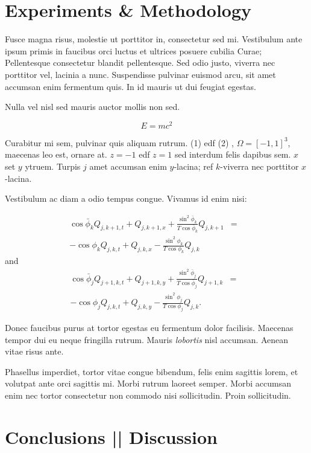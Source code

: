 \documentclass{article}
\begin{document}
\section{Experiments \& Methodology}

Fusce magna risus, molestie ut porttitor in, consectetur sed
mi. Vestibulum ante ipsum primis in faucibus orci luctus et ultrices
posuere cubilia Curae; Pellentesque consectetur blandit
pellentesque. Sed odio justo, viverra nec porttitor vel, lacinia a
nunc. Suspendisse pulvinar euismod arcu, sit amet accumsan enim
fermentum quis. In id mauris ut dui feugiat egestas. 


Nulla vel nisl sed mauris auctor mollis non sed. 

\begin{equation}
E = mc^{2}
\label{eqn:Einstein}
\end{equation}

Curabitur mi sem, pulvinar quis aliquam rutrum. (1) edf (2) ,
$\Omega=[-1,1]^3$, maecenas leo est, ornare at. $z=-1$ edf $z=1$ sed
interdum felis dapibus sem. $x$ set $y$ ytruem.  Turpis $j$ amet
accumsan enim $y$-lacina; ref $k$-viverra nec porttitor $x$-lacina.

Vestibulum ac diam a odio tempus congue. Vivamus id enim nisi:

\begin{eqnarray}
\cos\bar{\phi}_k Q_{j,k+1,t} + Q_{j,k+1,x}+\frac{\sin^2\bar{\phi}_k}{T\cos\bar{\phi}_k} Q_{j,k+1} &=&\nonumber\\ 
-\cos\phi_k Q_{j,k,t} + Q_{j,k,x}-\frac{\sin^2\phi_k}{T\cos\phi_k} Q_{j,k}\label{edgek}
\end{eqnarray}
and
\begin{eqnarray}
\cos\bar{\phi}_j Q_{j+1,k,t} + Q_{j+1,k,y}+\frac{\sin^2\bar{\phi}_j}{T\cos\bar{\phi}_j} Q_{j+1,k}&=&\nonumber \\
-\cos\phi_j Q_{j,k,t} + Q_{j,k,y}-\frac{\sin^2\phi_j}{T\cos\phi_j} Q_{j,k}.\label{edgej}
\end{eqnarray} 

Donec faucibus purus at tortor egestas eu fermentum dolor
facilisis. Maecenas tempor dui eu neque fringilla rutrum. Mauris
\emph{lobortis} nisl accumsan. Aenean vitae risus ante.
%

Phasellus imperdiet, tortor vitae congue bibendum, felis enim sagittis
lorem, et volutpat ante orci sagittis mi. Morbi rutrum laoreet
semper. Morbi accumsan enim nec tortor consectetur non commodo nisi
sollicitudin. Proin sollicitudin.

\section{Conclusions || Discussion }
\end{document}
